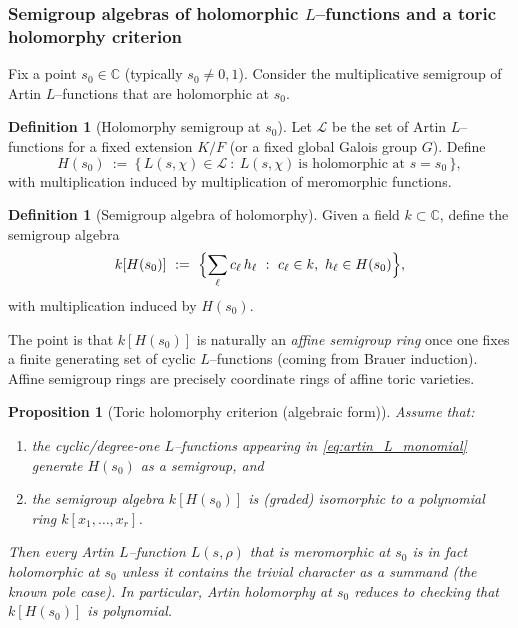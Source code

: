\documentclass[11pt,oneside]{amsbook}
\numberwithin{equation}{section}
\theoremstyle{plain}
\newtheorem{proposition}[theorem]{Proposition}
\theoremstyle{definition}
\newtheorem{definition}[theorem]{Definition}
\theoremstyle{remark}
\begin{document}
\subsubsection{Semigroup algebras of holomorphic $L$--functions and a toric holomorphy criterion}
Fix a point $s_0\in\mathbb{C}$ (typically $s_0\neq 0,1$).
Consider the multiplicative semigroup of Artin $L$--functions that are holomorphic at $s_0$.

\begin{definition}[Holomorphy semigroup at $s_0$]
\label{def:holomorphy_semigroup}
Let $\mathcal{L}$ be the set of Artin $L$--functions for a fixed extension $K/F$ (or a fixed global Galois group $G$).
Define
\[
H(s_0)\ :=\ \{\,L(s,\chi)\in \mathcal{L}\ :\ L(s,\chi)\ \text{is holomorphic at }s=s_0\,\},
\]
with multiplication induced by multiplication of meromorphic functions.
\end{definition}

\begin{definition}[Semigroup algebra of holomorphy]
Given a field $k\subset \mathbb{C}$, define the semigroup algebra
\[
k[H(s_0)]\ :=\ \Bigl\{\sum_{\ell} c_\ell\,h_\ell\ :\ c_\ell\in k,\ h_\ell\in H(s_0)\Bigr\},
\]
with multiplication induced by $H(s_0)$.
\end{definition}

The point is that $k[H(s_0)]$ is naturally an \emph{affine semigroup ring} once one fixes a finite generating set of cyclic $L$--functions (coming from Brauer induction).
Affine semigroup rings are precisely coordinate rings of affine toric varieties.

\begin{proposition}[Toric holomorphy criterion (algebraic form)]
\label{prop:toric_holomorphy_criterion}
Assume that:
\begin{enumerate}[label=(\alph*)]
\item the cyclic/degree-one $L$--functions appearing in \eqref{eq:artin_L_monomial} generate $H(s_0)$ as a semigroup, and
\item the semigroup algebra $k[H(s_0)]$ is (graded) isomorphic to a polynomial ring $k[x_1,\dots,x_r]$.
\end{enumerate}
Then every Artin $L$--function $L(s,\rho)$ that is \emph{meromorphic} at $s_0$ is in fact \emph{holomorphic} at $s_0$ unless it contains the trivial character as a summand (the known pole case).
In particular, Artin holomorphy at $s_0$ reduces to checking that $k[H(s_0)]$ is polynomial.
\end{proposition}
\end{document}
